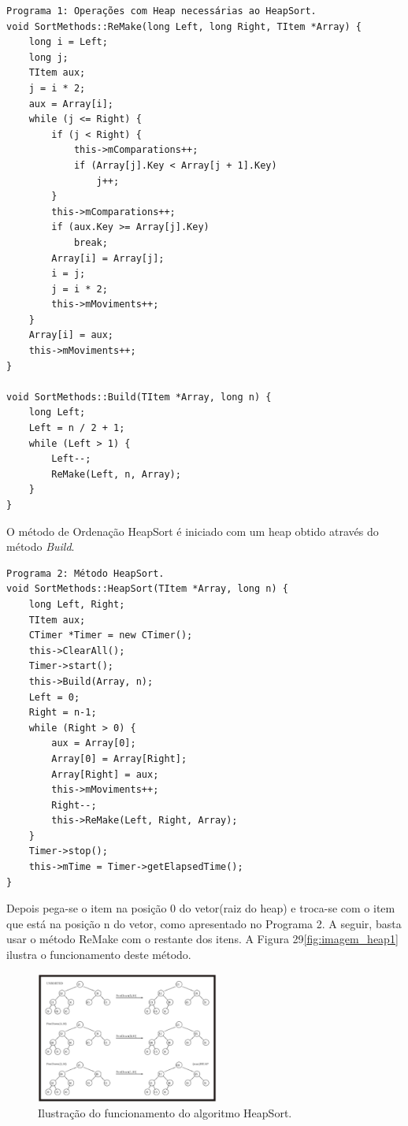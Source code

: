 \begin{verbatim}
Programa 1: Operações com Heap necessárias ao HeapSort.
void SortMethods::ReMake(long Left, long Right, TItem *Array) {
    long i = Left;
    long j;
    TItem aux;
    j = i * 2;
    aux = Array[i];
    while (j <= Right) {
        if (j < Right) {
            this->mComparations++;
            if (Array[j].Key < Array[j + 1].Key)
                j++;
        }
        this->mComparations++;
        if (aux.Key >= Array[j].Key)
            break;
        Array[i] = Array[j];
        i = j;
        j = i * 2;
        this->mMoviments++;
    }
    Array[i] = aux;
    this->mMoviments++;
}

void SortMethods::Build(TItem *Array, long n) {
    long Left;
    Left = n / 2 + 1;
    while (Left > 1) {
        Left--;
        ReMake(Left, n, Array);
    }
}
\end{verbatim}

O método de Ordenação HeapSort é iniciado com um heap obtido através do método \textit{Build}.

\begin{verbatim}
Programa 2: Método HeapSort.
void SortMethods::HeapSort(TItem *Array, long n) {
    long Left, Right;
    TItem aux;
    CTimer *Timer = new CTimer();
    this->ClearAll();
    Timer->start();
    this->Build(Array, n);
    Left = 0;
    Right = n-1;
    while (Right > 0) {
        aux = Array[0];
        Array[0] = Array[Right];
        Array[Right] = aux;
        this->mMoviments++;
        Right--;
        this->ReMake(Left, Right, Array);
    }
    Timer->stop();
    this->mTime = Timer->getElapsedTime();
}
\end{verbatim}

Depois pega-se o item na posição 0 do vetor(raiz do heap) e troca-se com o
item que está na posição n do vetor, como apresentado no Programa 2. A seguir,
basta usar o método ReMake com o restante dos itens. A Figura 29\ref{fig:imagem_heap1} ilustra o
funcionamento deste método.

 \begin{figure}[H]
    \centering
    \includegraphics[width = 6cm]{Imagens/Heap Sort/heapheao.png}
    \caption{Ilustração do funcionamento do algoritmo HeapSort. }
    \label{imagem_heap1}
\end{figure}

